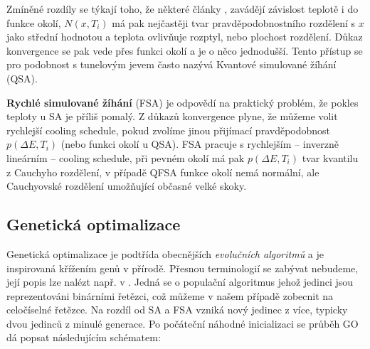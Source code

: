 Zmíněné rozdíly se týkají toho, že některé články \cite{SA survey},\cite{VFSA} zavádějí závislost teplotě i do funkce okolí, $N(x,T_i)$ má pak nejčastěji tvar pravděpodobnostního rozdělení s $x$ jako střední hodnotou a teplota ovlivňuje rozptyl, nebo plochost rozdělení. Důkaz konvergence se pak vede přes funkci okolí a je o něco jednodušší. Tento přístup se pro podobnost s tunelovým jevem často nazývá Kvantové simulované žíhání (QSA).

\textbf{Rychlé simulované žíhání} (FSA) \cite{VFSA} je odpovědí na praktický problém, že pokles teploty u SA je příliš pomalý. Z důkazů konvergence plyne, že můžeme volit rychlejší cooling schedule, pokud zvolíme jinou přijímací pravděpodobnost $p(\Delta E,T_i)$ (nebo funkci okolí u QSA). FSA pracuje s rychlejším -- inverzně lineárním -- cooling schedule, při pevném okolí má pak $p(\Delta E,T_i)$ tvar kvantilu z Cauchyho rozdělení, v případě QFSA funkce okolí nemá normální, ale Cauchyovské rozdělení umožňující občasné velké skoky.


\subsection{Genetická optimalizace}

Genetická optimalizace je podtřída obecnějších \emph{evolučních algoritmů} a je inspirovaná křížením genů v přírodě. Přesnou terminologií se zabývat nebudeme, její popis lze nalézt např. v \cite[p.~141]{GO ebook}. Jedná se o populační algoritmus jehož jedinci jsou reprezentováni binárními řetězci, což můžeme v našem případě zobecnit na celočíselné řetězce. Na rozdíl od SA a FSA vzniká nový jedinec z více, typicky dvou jedinců z minulé generace. Po počáteční náhodné inicializaci se průběh GO dá popsat následujícím schématem:

